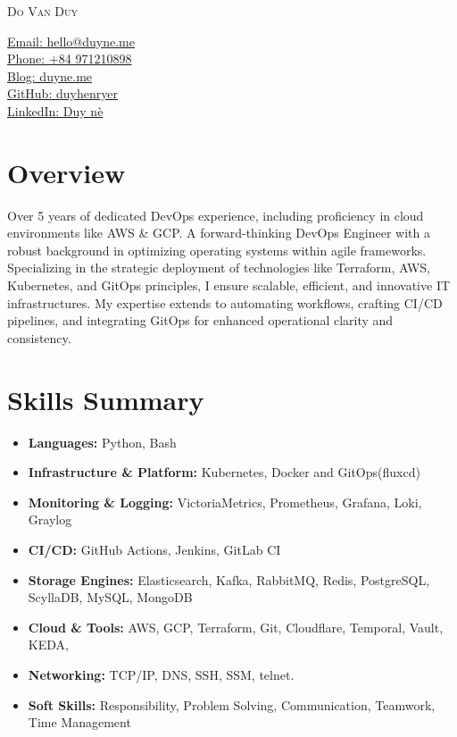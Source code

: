 \documentclass[11pt, a4paper]{article}
\begin{document}
\noindent
\begin{minipage}[t]{0.60\textwidth}
    \Huge\scshape Do Van Duy
\end{minipage}%
\begin{minipage}[t]{0.40\textwidth}
    \raggedleft
    \normalsize
    \href{mailto:hello@duyne.me}{Email: hello@duyne.me}\\
    \href{tel:+84971210898}{Phone: +84 971210898}\\
    \href{https://duyne.me}{Blog: duyne.me}\\
    \href{https://github.com/duyhenryerz}{GitHub: duyhenryer}\\
    \href{https://linkedin.com/in/duyne}{LinkedIn: Duy nè}
\end{minipage}
\vspace{0.75em}


\section{Overview}
\begingroup
{}
Over 5 years of dedicated DevOps experience, including proficiency in cloud environments like AWS \& GCP. A forward-thinking DevOps Engineer with a robust background in optimizing operating systems within agile frameworks. Specializing in the strategic deployment of technologies like Terraform, AWS, Kubernetes, and GitOps principles, I ensure scalable, efficient, and innovative IT infrastructures. My expertise extends to automating workflows, crafting CI/CD pipelines, and integrating GitOps for enhanced operational clarity and consistency.
\endgroup

\section{Skills Summary}
\begin{itemize}[leftmargin=*, label={}]
    \item \textbf{Languages:} Python, Bash
    \item \textbf{Infrastructure \& Platform:} Kubernetes, Docker and GitOps(fluxcd)
    \item \textbf{Monitoring \& Logging:} VictoriaMetrics, Prometheus, Grafana, Loki, Graylog
    \item \textbf{CI/CD:} GitHub Actions, Jenkins, GitLab CI
    \item \textbf{Storage Engines:} Elasticsearch, Kafka, RabbitMQ, Redis, PostgreSQL, ScyllaDB, MySQL, MongoDB
    \item \textbf{Cloud \& Tools:} AWS, GCP, Terraform, Git, Cloudflare, Temporal, Vault, KEDA,
    \item \textbf{Networking:} TCP/IP, DNS, SSH, SSM, telnet.
    \item \textbf{Soft Skills:} Responsibility, Problem Solving, Communication, Teamwork, Time Management    
\end{itemize}
\end{document}
